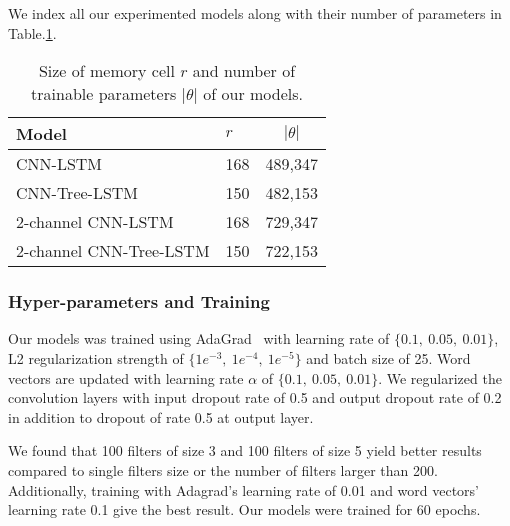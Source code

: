 We index all our experimented models along with their number of parameters in Table.\ref{table:paramtable}.
\begin{table}[H]
	\centering
	\caption{Size of memory cell \(r\) and number of trainable parameters \(\left\vert{\theta}\right\vert\) of our models. 
	}
	\label{table:paramtable}
	\begin{tabular}{|l|l|l|}
		\hline
		Model & \(r\) & \multicolumn{1}{|c|}{\(\left\vert{\theta}\right\vert\)}\\ \hline
		CNN-LSTM                 & 168         & 489,347          \\
		CNN-Tree-LSTM            & 150         & 482,153          \\
		2-channel CNN-LSTM       & 168         & 729,347          \\
		2-channel CNN-Tree-LSTM  & 150         & 
		722,153 \\
		\hline
	\end{tabular}
\end{table}
\subsubsection{Hyper-parameters and Training}
Our models was trained using AdaGrad~\cite{duchi2011adaptive} with learning rate of $\{0.1,~ 0.05,~ 0.01\}$, L2 regularization strength of $\{1e^{-3},~ 1e^{-4}, ~ 1e^{-5} \}$ and batch size of 25.
Word vectors are updated with learning rate $\alpha$ of $\{0.1,~0.05, ~0.01\}$.
We regularized the convolution layers with input dropout rate of 0.5 and output dropout rate of 0.2 in addition to dropout of rate 0.5 at output layer.

We found that 100 filters of size 3 and 100 filters of size 5 yield better results compared to single filters size or the number of filters larger than 200. 
Additionally, training with Adagrad's learning rate of 0.01 and word vectors' learning rate 0.1 give the best result. 
Our models were trained for 60 epochs.
